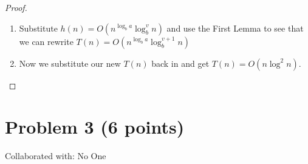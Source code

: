 \documentclass{article}
\begin{document}
\begin{proof}
\begin{enumerate}
\begin{proof}[First Lemma: if \(n = b^s\) for some \(s\)]
\begin{enumerate}
                                    \[h(n)=n^{\log_b a} \log_b^v n \sum_{i=0}^{\log_b
                                          n-1}{(\frac{a}{b^{\log_b a}})}^i = n^{\log_b a}
                                          \log_b^{v+1} n\]
                              \item If \(n=b^s\) then sub in for \(n\) and \(b=2\) in the
                                    recurrence relation and we get \(T(2^s) = 2T(2^{s-1}) + 2^s
                                    \log_2 2^s = 2T(2^{s-1}) + s \cdot 2^{s}\).
                              \item Let \(q(s) = T(2^s)\) and rewrite our recurrence relation as
                                    \[q(s) = 2q(s-1) + s2^s\]
                                    \[= 2(2q(s-2) + (s-1)2^{s-1}) + s2^s\]
                                    \[= 4q(s-2) + 2^s (s-1) + s2^s \]
                                    \[= 4(2q(s-3) + 2^{s-2} (s-2)) + 2^s (s-1) + s2^s\]
                                    \[= 8q(s-3) + 2^s (s-2) + 2^s (s-1) + s2^s\]
                                    \[q(s) = 2^s q(0) + 2^s (1+2+\cdots+s)= 2^s q(0) +
                                          2^s\frac{s(s+1)}{2}\]
                                    \[q(s)= 2^s q(0) + s2^{s-1}(s+1)\]
                              \item Taking the above recurrence and a base case \(T(1)=O(1)\) per
                                    the given, we can tranform the recurrence relation into \(T(n)
                                    = O(n^{\log_b a}) + \sum_{i=0}^{\log_b n-1} a^i
                                    h(\frac{n}{b^i})\) by induction.
                        \end{enumerate}
                  \end{proof}
            \item Substitute \(h(n) = O(n^{\log_b a} \log_b^v n)\) and use the First Lemma to
                  see that we can rewrite \(T(n) = O(n^{\log_b a} \log_b^{v+1} n)\)
            \item Now we substitute our new \(T(n)\) back in and get \(T(n) = O(n \log^2 n)\).
      \end{enumerate}
\end{proof}

\newpage

\section{Problem 3 (6 points)}
Collaborated with: No One
\end{document}
